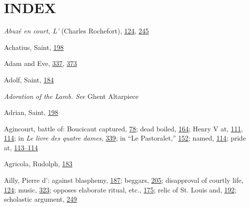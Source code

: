 \chapter{INDEX}

\emph{Abuzé en court, L'} (Charles Rochefort),
\protect\hyperlink{10_Chapter_Three__THE_HEROIC_DREAM.xhtmlux5cux23page_124}{124},
\protect\hyperlink{16_Chapter_Nine__THE_DECLINE_OF_SYM.xhtmlux5cux23page_245}{245}

Achatius, Saint,
\protect\hyperlink{13_Chapter_Six__THE_DEPICTION_OF_TH.xhtmlux5cux23page_198}{198}

Adam and Eve,
\protect\hyperlink{21_Chapter_Thirteen__IMAGE_AND_WORD.xhtmlux5cux23page_337}{337},
\protect\hyperlink{21_Chapter_Thirteen__IMAGE_AND_WORD.xhtmlux5cux23page_373}{373}

Adolf, Saint,
\protect\hyperlink{13_Chapter_Six__THE_DEPICTION_OF_TH.xhtmlux5cux23page_184}{184}

\emph{Adoration of the Lamb. See} Ghent Altarpiece

Adrian, Saint,
\protect\hyperlink{13_Chapter_Six__THE_DEPICTION_OF_TH.xhtmlux5cux23page_198}{198}

Agincourt, battle of: Boucicaut captured,
\protect\hyperlink{10_Chapter_Three__THE_HEROIC_DREAM.xhtmlux5cux23page_78}{78};
dead boiled,
\protect\hyperlink{12_Chapter_Five__THE_VISION_OF_DEAT.xhtmlux5cux23page_164}{164};
Henry V at,
\protect\hyperlink{10_Chapter_Three__THE_HEROIC_DREAM.xhtmlux5cux23page_111}{111},
\protect\hyperlink{10_Chapter_Three__THE_HEROIC_DREAM.xhtmlux5cux23page_114}{114};
in \emph{Le livre des quatre dames},
\protect\hyperlink{21_Chapter_Thirteen__IMAGE_AND_WORD.xhtmlux5cux23page_339}{339};
in ``Le Pastoralet,''
\protect\hyperlink{11_Chapter_Four__THE_FORMS_OF_LOVE.xhtmlux5cux23page_152}{152};
named,
\protect\hyperlink{10_Chapter_Three__THE_HEROIC_DREAM.xhtmlux5cux23page_114}{114};
pride at,
\protect\hyperlink{10_Chapter_Three__THE_HEROIC_DREAM.xhtmlux5cux23page_113}{113--}\protect\hyperlink{10_Chapter_Three__THE_HEROIC_DREAM.xhtmlux5cux23page_114}{114}

Agricola, Rudolph,
\protect\hyperlink{13_Chapter_Six__THE_DEPICTION_OF_TH.xhtmlux5cux23page_183}{183}

Ailly, Pierre d': against blasphemy,
\protect\hyperlink{13_Chapter_Six__THE_DEPICTION_OF_TH.xhtmlux5cux23page_187}{187};
beggars,
\protect\hyperlink{14_Chapter_Seven__THE_PIOUS_PERSONA.xhtmlux5cux23page_205}{205};
disapproval of courtly life,
\protect\hyperlink{10_Chapter_Three__THE_HEROIC_DREAM.xhtmlux5cux23page_124}{124};
music,
\protect\hyperlink{20_ILLUSTRATIONS_FOLLOW_PAGE.xhtmlux5cux23page_323}{323};
opposes elaborate ritual, etc.,
\protect\hyperlink{13_Chapter_Six__THE_DEPICTION_OF_TH.xhtmlux5cux23page_175}{175};
relic of St. Louis and,
\protect\hyperlink{13_Chapter_Six__THE_DEPICTION_OF_TH.xhtmlux5cux23page_192}{192};
scholastic argument,
\protect\hyperlink{17_Chapter_Ten__THE_FAILURE_OF_IMAG.xhtmlux5cux23page_249}{249}

